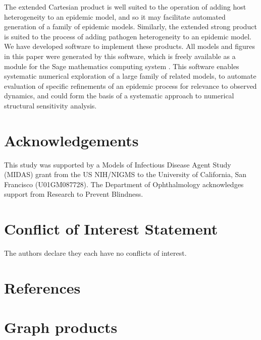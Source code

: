 \documentclass[review]{elsarticle}
\begin{document}
The extended Cartesian product is well suited to
the operation of adding host heterogeneity to
an epidemic model, and so it
may facilitate automated generation of a family of
epidemic models.  Similarly, the extended strong product
is suited to the process of adding pathogen heterogeneity to
an epidemic model.
We have developed software to implement these products.
All models and figures in this paper were
generated by this software, which is freely available
as a module for the Sage mathematics computing system
\cite{worden-boxmodels-github}.
This software enables systematic numerical exploration of
a large family of related models, to automate
evaluation of specific refinements of an epidemic process for relevance
to observed dynamics, and
could form the basis of a systematic approach to
numerical structural sensitivity analysis.

\section{Acknowledgements}

This study was supported by a Models of Infectious Disease Agent Study
(MIDAS) grant from the US NIH/NIGMS to the University of California, San
Francisco (U01GM087728). The Department of Ophthalmology acknowledges
support from Research to Prevent Blindness.

\section{Conflict of Interest Statement}

The authors declare they each have no conflicts of interest.


\section{References}





\appendix

\section{Graph products}
\label{app:graph-products}
\end{document}
